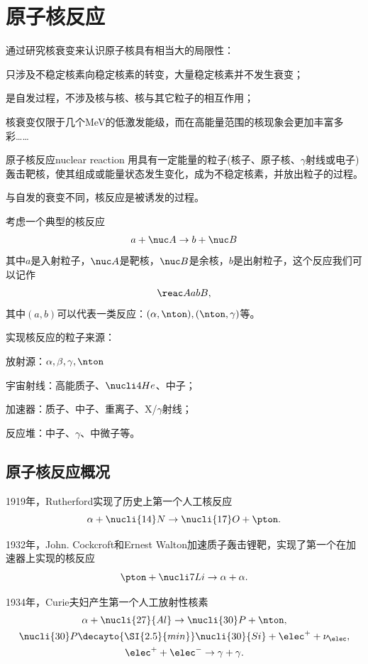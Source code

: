 \chapter{原子核反应}
通过研究核衰变来认识原子核具有相当大的局限性：
\begin{compactitem}
	\item 只涉及不稳定核素向稳定核素的转变，大量稳定核素并不发生衰变；
	\item 是自发过程，不涉及核与核、核与其它粒子的相互作用；
	\item 核衰变仅限于几个MeV的低激发能级，而在高能量范围的核现象会更加丰富多彩……
\end{compactitem} 

\begin{definition}{原子核反应}{nuclear reaction}
	用具有一定能量的粒子(核子、原子核、$\gamma$射线或电子)轰击靶核，使其组成或能量状态发生变化，成为不稳定核素，并放出粒子的过程。
\end{definition}
与自发的衰变不同，核反应是被诱发的过程。

考虑一个典型的核反应
\begin{align}\label{AabB}
	a+\nuc A\to b+\nuc B
\end{align}
其中$a$是入射粒子，$\nuc A$是靶核，$\nuc B$是余核，$b$是出射粒子，这个反应我们可以记作
\[
	\reac AabB,
\]
其中$(a,b)$可以代表一类反应：$(\alpha,\nton),(\nton,\gamma)$等。

实现核反应的粒子来源：
\begin{compactitem}
	\item 放射源：$\alpha,\beta,\gamma,\nton$
	\item 宇宙射线：高能质子、$\nucli4{He}$、中子；
	\item 加速器：质子、中子、重离子、X/$\gamma$射线；
	\item 反应堆：中子、$\gamma$、中微子等。
\end{compactitem}
\section{原子核反应概况}
1919年，Rutherford实现了历史上第一个人工核反应
\[
	\alpha+\nucli{14}N\to\nucli{17}O+\pton.
\]

1932年，John. Cockcroft和Ernest Walton加速质子轰击锂靶，实现了第一个在加速器上实现的核反应
\[
	\pton+\nucli 7{Li}\to\alpha+\alpha.
\]

1934年，Curie夫妇产生第一个人工放射性核素
\begin{gather*}
	\alpha+\nucli{27}{Al}\to\nucli{30}P+\nton,\\
	\nucli{30}P\decayto{\SI{2.5}{min}}\nucli{30}{Si}+\elec^++\nu_\elec,\\
	\elec^++\elec^-\to\gamma+\gamma.
\end{gather*}

